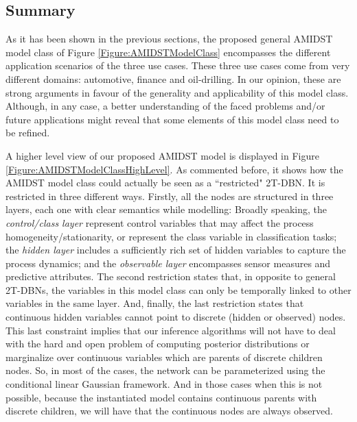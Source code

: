 \subsection{Summary}\label{summaryAMIDSTModels}

As it has been shown in the previous sections, the proposed general AMIDST model class of Figure \ref{Figure:AMIDSTModelClass} encompasses the different application scenarios of the three use cases. These three use cases come from very different domains: automotive, finance and oil-drilling. In our opinion, these are strong arguments in favour of the generality and applicability of this model class. Although, in any case, a better understanding of the faced problems and/or future applications might reveal that some elements of this model class need to be refined.  

A higher level view of our proposed AMIDST model is displayed in Figure \ref{Figure:AMIDSTModelClassHighLevel}. As commented before, it shows how the AMIDST model class could actually be seen as a ``restricted" 2T-DBN. It is restricted in three different ways. Firstly, all the nodes are structured in three layers, each one with clear semantics while modelling: Broadly speaking, the \textit{control/class layer} represent control variables that may affect the process homogeneity/stationarity, or represent the class variable in classification tasks; the \textit{hidden layer} includes a sufficiently rich set of hidden variables to capture the process dynamics; and the \textit{observable layer} encompasses sensor measures and predictive attributes. The second restriction states that, in opposite to general 2T-DBNs, the variables in this model class can only be temporally linked to other variables in the same layer. And, finally, the last restriction  states that continuous hidden variables cannot point to discrete (hidden or observed) nodes. This last constraint implies that our inference algorithms will not have to deal with the hard and open problem of computing posterior distributions or marginalize over continuous variables which are parents of discrete children nodes. So, in most of the cases, the network can be parameterized using the conditional linear Gaussian framework. And in those cases when this is not possible, because the instantiated model contains continuous parents with discrete children, we will have that the continuous nodes are always observed. 

